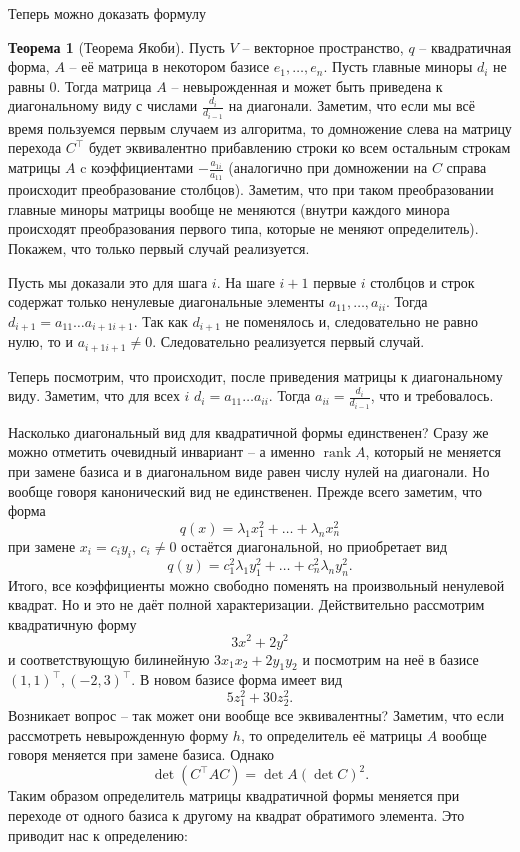 \documentclass[10pt,a4paper,oneside]{book} %
\theoremstyle{definition}
\newtheorem{thm}{Теорема}
\newcommand{\rank}{\operatorname{rank}}
\def\thrm{\begin{thm}}
\def\ethrm{\end{thm}}
\begin{document}
Теперь можно доказать формулу 
\thrm[Теорема Якоби]
Пусть $V$ -- векторное пространство, $q$ -- квадратичная форма, $A$ -- её матрица в некотором базисе $e_1,\dots,e_n$. Пусть главные миноры $d_i$ не равны 0. 
Тогда матрица $A$ -- невырожденная и может быть приведена к диагональному виду с числами $\frac{d_{i}}{d_{i-1}}$ на диагонали.
\proof Заметим, что если мы всё время пользуемся первым случаем из алгоритма, то домножение слева на матрицу перехода $C^{\top}$ будет эквивалентно прибавлению строки ко всем остальным строкам матрицы $A$ c коэффициентами $-\frac{a_{1i}}{a_{11}}$ (аналогично при домножении на $C$ справа происходит преобразование столбцов). Заметим, что при таком преобразовании главные миноры матрицы вообще не меняются (внутри каждого минора происходят преобразования первого типа, которые не меняют определитель). Покажем, что только первый случай реализуется. 

Пусть мы доказали это для шага $i$. На шаге $i+1$ первые $i$ столбцов и строк содержат только ненулевые диагональные элементы $a_{11},\dots, a_{ii}$. Тогда $d_{i+1}=a_{11}\dots a_{i+1 i+1}$. Так как $d_{i+1}$ не  поменялось и, следовательно не равно нулю, то и $a_{i+1 i+1} \neq 0$. Следовательно реализуется первый случай. 

Теперь посмотрим, что происходит, после приведения матрицы к диагональному виду. Заметим, что для всех $i$ $d_i=a_{11}\dots a_{ii}$. Тогда $a_{ii}=\frac{d_i}{d_{i-1}}$, что и требовалось.
\endproof
\ethrm




Насколько диагональный вид для квадратичной формы единственен? Сразу же можно отметить очевидный инвариант -- а именно $\rank A$, который не меняется при замене базиса и в диагональном виде равен числу нулей на диагонали. Но вообще говоря канонический вид не единственен. Прежде всего заметим, что форма 
$$q(x)=\lambda_1 x_1^2+\dots+\lambda_nx_n^2$$
при замене $x_i=c_i y_i$, $c_i\neq 0$ остаётся диагональной, но приобретает вид 
$$q(y)=c_1^2\lambda_1y_1^2+\dots+c_n^2\lambda_ny_n^2.$$
Итого, все коэффициенты можно свободно поменять на произвольный ненулевой квадрат. Но и это не даёт полной характеризации. Действительно  рассмотрим квадратичную форму
$$3x^2+2y^2$$
и соответствующую билинейную $3x_1x_2+2y_1y_2$ и посмотрим на неё в базисе $(1,1)^{\top}, (-2,3)^{\top}$. В новом базисе форма имеет вид
$$5z_1^2+30z_2^2.$$
Возникает вопрос -- так может они вообще все эквивалентны? Заметим, что если рассмотреть невырожденную форму $h$, то определитель её матрицы $A$ вообще говоря меняется при замене базиса. Однако 
$$\det(C^{\top}AC)=\det A (\det C)^2.$$
Таким образом определитель матрицы квадратичной формы меняется при переходе от одного базиса к другому на квадрат обратимого элемента. Это приводит нас к определению:
\end{document}
